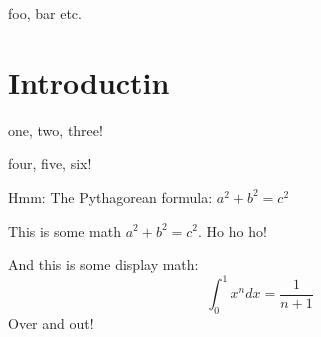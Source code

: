 
foo, bar
etc.




\newcommand{\DT}{{\mathbb S}}

\section{Introductin}

one, two, three!

four, five, six!

\begin{theorem}
Hmm: The Pythagorean formula: $a^2 + b^2 = c^2$
\end{theorem}

This is some math $a^2 + b^2 = c^2$.  Ho ho ho!

And this is some display math: \[\int_0^1 x^n dx = \frac{1}{n+1}\]
Over and out!


